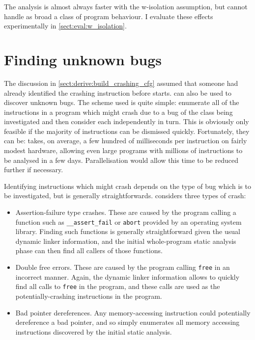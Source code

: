 The analysis is almost always faster with the \gls{w-isolation}
assumption, but cannot handle as broad a class of program behaviour.
I evaluate these effects experimentally in
\autoref{sect:eval:w_isolation}.

\section{Finding unknown bugs}
\label{sect:derive:unknown_bugs}

The discussion in \autoref{sect:derive:build_crashing_cfg} assumed
that someone had already identified the crashing instruction before
{\technique} starts.  {\Technique} can also be used to discover
unknown bugs.  The scheme used is quite simple: enumerate all of the
instructions in a program which might crash due to a bug of the class
being investigated and then consider each independently in turn.  This
is obviously only feasible if the majority of instructions can be
dismissed quickly.  Fortunately, they can be: {\implementation} takes,
on average, a few hundred of milliseconds per instruction on fairly
modest hardware, allowing even large programs with millions of
instructions to be analysed in a few days.  Parallelisation would allow this time to be
reduced further if necessary.

Identifying instructions which might crash depends on the type of bug
which is to be investigated, but is generally straightforwards.
{\Implementation} considers three types of crash:

\begin{itemize}
\item Assertion-failure type crashes.  These are caused by the program
  calling a function such as \verb|__assert_fail| or \verb|abort|
  provided by an operating system library.  Finding such functions is
  generally straightforward given the usual dynamic linker
  information, and the initial whole-program static analysis phase can
  then find all callers of those functions.
\item Double free errors.  These are caused by the program calling
  \verb|free| in an incorrect manner.  Again, the dynamic linker
  information allows {\implementation} to quickly find all calls to
  \verb|free| in the program, and these calls are used as the
  potentially-crashing instructions in the program.
\item Bad pointer dereferences.  Any memory-accessing instruction
  could potentially dereference a bad pointer, and so
  {\implementation} simply enumerates all memory accessing
  instructions discovered by the initial static analysis.
\end{itemize}

